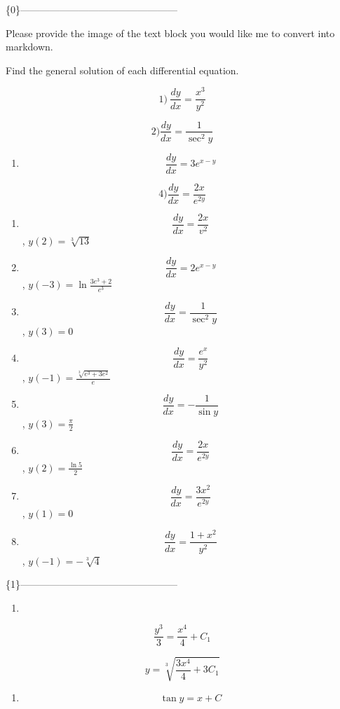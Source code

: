 \documentclass[
]{article}
\author{}
\date{}
\providecommand{\tightlist}{%
  \setlength{\itemsep}{0pt}\setlength{\parskip}{0pt}}
\begin{document}
\{0\}------------------------------------------------

Please provide the image of the text block you would like me to convert
into markdown.

Find the general solution of each differential equation.

\[1) \ \frac{dy}{dx} = \frac{x^3}{y^2}\]

\[2) \frac{dy}{dx} = \frac{1}{\sec^2 y}\]

\begin{enumerate}
\def\labelenumi{\arabic{enumi})}
\setcounter{enumi}{2}
\tightlist
\item
  \[\frac{dy}{dx} = 3e^{x-y}\]
\end{enumerate}

\[4) \frac{dy}{dx} = \frac{2x}{e^{2y}}\]

\begin{enumerate}
\def\labelenumi{\arabic{enumi})}
\setcounter{enumi}{4}
\item
  \[\frac{dy}{dx} = \frac{2x}{v^2}\] , \(y(2) = \sqrt[3]{13}\)
\item
  \[\frac{dy}{dx} = 2e^{x-y}\] , \(y(-3) = \ln \frac{3e^3 + 2}{e^3}\)
\item
  \[\frac{dy}{dx} = \frac{1}{\sec^2 y}\] , \(y(3) = 0\)
\item
  \[\frac{dy}{dx} = \frac{e^x}{y^2}\] ,
  \(y(-1) = \frac{\sqrt[3]{e^3 + 3e^2}}{e}\)
\item
  \[\frac{dy}{dx} = -\frac{1}{\sin y}\] , \(y(3) = \frac{\pi}{2}\)
\item
  \[\frac{dy}{dx} = \frac{2x}{e^{2y}}\] , \(y(2) = \frac{\ln 5}{2}\)
\item
  \[\frac{dy}{dx} = \frac{3x^2}{e^{2y}}\] , \(y(1) = 0\)
\item
  \[\frac{dy}{dx} = \frac{1+x^2}{y^2}\] , \(y(-1) = -\sqrt[3]{4}\)
\end{enumerate}

\{1\}------------------------------------------------

\begin{enumerate}
\def\labelenumi{\arabic{enumi})}
\tightlist
\item
\end{enumerate}

\[\frac{y^3}{3} = \frac{x^4}{4} + C_1\]

\[y = \sqrt[3]{\frac{3x^4}{4} + 3C_1}\]

\begin{enumerate}
\def\labelenumi{\arabic{enumi})}
\setcounter{enumi}{1}
\tightlist
\item
  \[\tan y = x + C\]
\end{enumerate}
\end{document}
